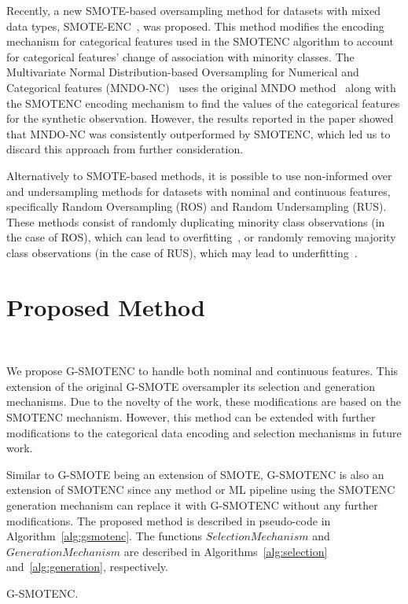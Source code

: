 \documentclass[preprint,12pt]{elsarticle}
\begin{document}
{Recently, a new SMOTE-based oversampling method for
datasets with mixed data types, SMOTE-ENC~\cite{mukherjee2021smote}, was
proposed. This method modifies the encoding mechanism for categorical features
used in the SMOTENC algorithm to account for categorical features' change of
association with minority classes. The Multivariate Normal Distribution-based
Oversampling for Numerical and Categorical features
(MNDO-NC)~\cite{ambai2019multivariate} uses the original MNDO
method~\cite{ambai2018mndo} along with the SMOTENC encoding mechanism to find
the values of the categorical features for the synthetic observation. However,
the results reported in the paper showed that MNDO-NC was consistently
outperformed by SMOTENC, which led us to discard this approach from further
consideration.

Alternatively to SMOTE-based methods, it is possible to use non-informed over
and undersampling methods for datasets with nominal and continuous features,
specifically Random Oversampling (ROS) and Random Undersampling (RUS). These
methods consist of randomly duplicating minority class observations (in the
case of ROS), which can lead to overfitting~\cite{park2021combined,
batista2004study}, or randomly removing majority class observations (in the
case of RUS), which may lead to underfitting~\cite{bansal2021analysis}.


\section{Proposed Method}~\label{sec:proposed_method}

We propose G-SMOTENC to handle both nominal and continuous features. This
extension of the original G-SMOTE oversampler its selection and generation
mechanisms. Due to the novelty of the work, these modifications are based on
the SMOTENC mechanism. However, this method can be extended with further
modifications to the categorical data encoding and selection mechanisms in
future work. 

Similar to G-SMOTE being an extension of SMOTE, G-SMOTENC is also an extension
of SMOTENC since any method or ML pipeline using the SMOTENC generation
mechanism can replace it with G-SMOTENC without any further modifications. The
proposed method is described in pseudo-code in Algorithm~\ref{alg:gsmotenc}.
The functions $SelectionMechanism$ and $GenerationMechanism$ are described in
Algorithms~\ref{alg:selection} and~\ref{alg:generation}, respectively.

\begin{algorithm}
    \caption{G-SMOTENC.}\label{alg:gsmotenc}
    \DontPrintSemicolon%
    

\end{algorithm}}
\end{document}
